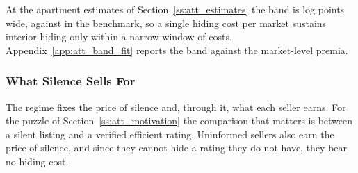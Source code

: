 At the apartment estimates of Section~\ref{ss:att_estimates} the band is \attBandWidthApt{} log points wide, against \attBandWidthBaseApt{} in the benchmark, so a single hiding cost per market sustains interior hiding only within a narrow window of costs. Appendix~\ref{app:att_band_fit} reports the band against the market-level premia.

\subsubsection{What Silence Sells For}
\label{ss:att_what}

The regime fixes the price of silence and, through it, what each seller earns. For the puzzle of Section~\ref{ss:att_motivation} the comparison that matters is between a silent listing and a verified efficient rating. Uninformed sellers also earn the price of silence, and since they cannot hide a rating they do not have, they bear no hiding cost.

